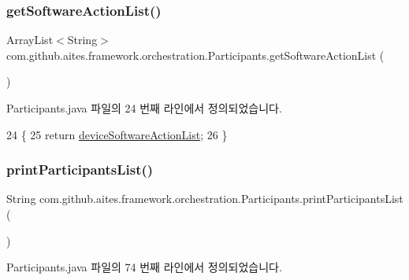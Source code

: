 \subsubsection{\texorpdfstring{get\+Software\+Action\+List()}{getSoftwareActionList()}}
{\footnotesize\ttfamily Array\+List$<$String$>$ com.\+github.\+aites.\+framework.\+orchestration.\+Participants.\+get\+Software\+Action\+List (\begin{DoxyParamCaption}{ }\end{DoxyParamCaption})}



Participants.\+java 파일의 24 번째 라인에서 정의되었습니다.


\begin{DoxyCode}
24                                                     \{
25         \textcolor{keywordflow}{return} \mbox{\hyperlink{classcom_1_1github_1_1aites_1_1framework_1_1orchestration_1_1_participants_ac53ce12002e42b5ed3b6ff38afbbaf01}{deviceSoftwareActionList}};
26     \}
\end{DoxyCode}
\mbox{\label{classcom_1_1github_1_1aites_1_1framework_1_1orchestration_1_1_participants_a3f8b65344bf9bca47538ddb270646476}} 
\subsubsection{\texorpdfstring{print\+Participants\+List()}{printParticipantsList()}}
{\footnotesize\ttfamily String com.\+github.\+aites.\+framework.\+orchestration.\+Participants.\+print\+Participants\+List (\begin{DoxyParamCaption}{ }\end{DoxyParamCaption})}



Participants.\+java 파일의 74 번째 라인에서 정의되었습니다.


